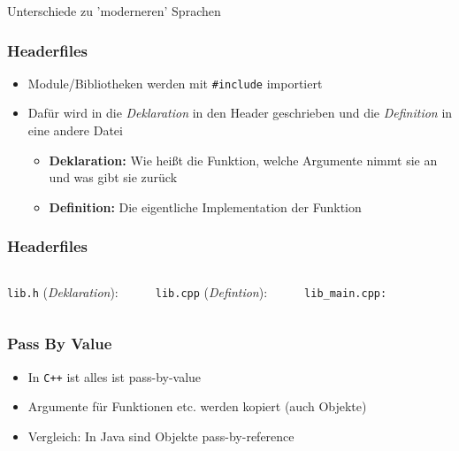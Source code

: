 \documentclass[plain]{beamer}
\newcommand{\cpp}{\texttt{C++}}
\begin{document}
\begin{frame}
  \center \huge Unterschiede zu 'moderneren' Sprachen
\end{frame}

\begin{frame}
  \frametitle{Headerfiles}
  \begin{itemize}
    \item Module/Bibliotheken werden mit \texttt{\#include} importiert
    \item Dafür wird in die \emph{Deklaration} in den Header geschrieben und die \emph{Definition}
      in eine andere Datei
      \begin{itemize}
        \item \textbf{Deklaration:} Wie heißt die Funktion, welche Argumente nimmt sie an und was
          gibt sie zurück
        \item \textbf{Definition:} Die eigentliche Implementation der Funktion
      \end{itemize}
  \end{itemize}
\end{frame}


\begin{frame}
  \frametitle{Headerfiles}
  \begin{columns}[onlytextwidth,T]
    \texttt{lib.h} (\emph{Deklaration}):
    \inputminted{cpp}{code/examples/lib.h}
    \vspace{5mm}
    \texttt{lib.cpp} (\emph{Defintion}):
    \inputminted{cpp}{code/examples/lib.cpp}
    \texttt{lib\_main.cpp:}
    \inputminted{cpp}{code/examples/lib_main.cpp}
  \end{columns}
\end{frame}


\begin{frame}
  \frametitle{Pass By Value}
  \begin{itemize}
    \item In \cpp{} ist alles ist pass-by-value
    \item Argumente für Funktionen etc. werden kopiert (auch Objekte)
    \item Vergleich: In Java sind Objekte pass-by-reference
  \end{itemize}
\end{frame}
\end{document}
